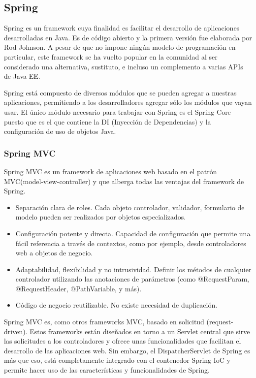 \subsection{Spring}
Spring es un framework cuya finalidad es facilitar el desarrollo de aplicaciones desarrolladas en Java. Es de código abierto y la primera versión fue elaborada por Rod Johnson. A pesar de que no impone ningún modelo de programación en particular, este framework se ha vuelto popular en la comunidad al ser considerado una alternativa, sustituto, e incluso un complemento a varias APIs de Java EE.

Spring está compuesto de diversos módulos que se pueden agregar a nuestras aplicaciones, permitiendo a los desarrolladores agregar sólo los módulos que vayan usar. El único módulo necesario para trabajar con Spring es el Spring Core puesto que es el que contiene la DI (Inyección de Dependencias) y la configuración de uso de objetos Java.

\subsubsection*{Spring MVC}
Spring MVC es un framework de aplicaciones web basado en el patrón MVC(model-view-controller) y que alberga todas las ventajas del framework de Spring.
	\begin{itemize}
		 \item Separación clara de roles. Cada objeto controlador, validador, formulario de modelo pueden ser realizados por objetos especializados.
		 \item Configuración potente y directa. Capacidad de configuración que permite una fácil referencia a través de contextos, como por ejemplo, desde controladores web a objetos de negocio.
		 \item Adaptabilidad, flexibilidad y no intrusividad. Definir los métodos de cualquier controlador utilizando las anotaciones de parámetros (como @RequestParam, @RequestHeader, @PathVariable, y más).
		 \item Código de negocio reutilizable. No existe necesidad de duplicación.
	\end{itemize}
	
Spring MVC es, como otros frameworks MVC, basado en solicitud (request-driven). Estos frameworks están diseñados en torno a un Servlet central que sirve las solicitudes a los controladores y ofrece unas funcionalidades que facilitan el desarrollo de las aplicaciones web. Sin embargo, el DispatcherServlet de Spring es más que eso, está completamente integrado con el contenedor Spring IoC y permite hacer uso de las características y funcionalidades de Spring.

